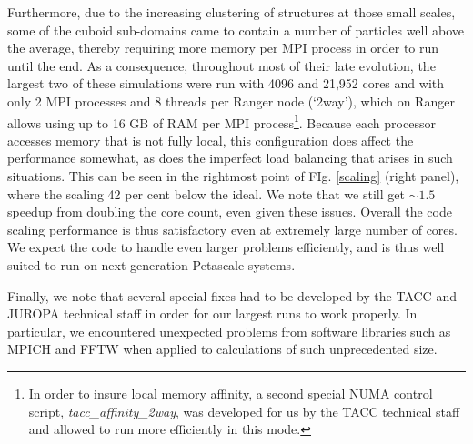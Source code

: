 Furthermore, due to the increasing clustering of structures at those small 
scales, some of the cuboid sub-domains came to contain a number of particles
well above the 
average, thereby requiring more memory per {\small MPI} process
in order to run until the end. 
As a consequence,  throughout most of their late evolution, the 
largest two of these simulations were run with 4096 and 21,952 cores and 
with only 2 {\small MPI} processes and 8 threads per Ranger node (`2way'), which on 
Ranger allows using up to 16 GB of RAM per {\small MPI} process\footnote{In order to insure 
local memory affinity,  a second special NUMA control script, {\it tacc\_affinity\_2way}, 
was developed for us by the TACC technical staff and allowed to run more efficiently 
in this mode.}. Because each processor accesses memory that is not fully local, this configuration does affect the 
performance somewhat, as does the imperfect load balancing that arises in such situations.
This can be seen in the rightmost point of FIg. \ref{scaling} (right panel), where the scaling 42 per cent below the ideal.
We note that we still get $\sim1.5$ speedup
from doubling the core count, even given these issues. Overall the
code scaling performance is thus satisfactory even at extremely large number of cores.
 We expect the code to handle even larger problems efficiently, and is thus well suited to run on
  next generation Petascale systems. 

Finally, we note that several special fixes had to be developed by  the TACC 
and JUROPA technical staff in order for our largest runs to work properly.
In particular, we encountered unexpected problems from software libraries such as 
{\small MPICH} and {\small FFTW} when applied to calculations of such 
unprecedented size. 

